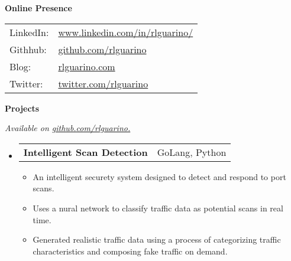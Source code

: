 \documentclass[letterpaper,11pt]{article}
\makeatletter
\newcommand{\resheading}[1]{{\large \colorbox{mygrey}{\begin{minipage}{\textwidth}{\textbf{#1 \vphantom{p\^{E}}}}\end{minipage}}}}
\newcommand{\restwosubheading}[2]{
\begin{tabular*}{6.5in}{l@{\extracolsep{\fill}}r}
		\textbf{#1} & #2 \\
\end{tabular*}\vspace{-6pt}}
\makeatother
\begin{document}
\resheading{Online Presence}
{
	\begin{tabularx}{2in}{XX}
		LinkedIn: & \href{http://www.linkedin.com/in/rlguarino/}{www.linkedin.com/in/rlguarino/} \\
		Githhub: & \href{http://www.github.com/rlguarino}{github.com/rlguarino} \\
		Blog: & \href{http://www.rlguarino.com/}{rlguarino.com} \\
		Twitter: & \href{https://twitter.com/rlguarino}{twitter.com/rlguarino} \\
	\end{tabularx}
}
\pagebreak

\resheading{Projects}
{ \footnotesize
	\textit{Available on {\href{http://www.github.com/rlguarino/}{github.com/rlguarino.}}}
	\begin{itemize}
          \item
            \restwosubheading{Intelligent Scan Detection}{GoLang, Python}
            \begin{itemize}
              \item{An intelligent securety system designed to detect and respond to port scans.}
              \item{Uses a nural network to classify traffic data as potential scans in real time. }
              \item{Generated realistic traffic data using a process of categorizing traffic characteristics and composing fake traffic on demand.}
            \end{itemize}


\end{itemize}}
\end{document}

